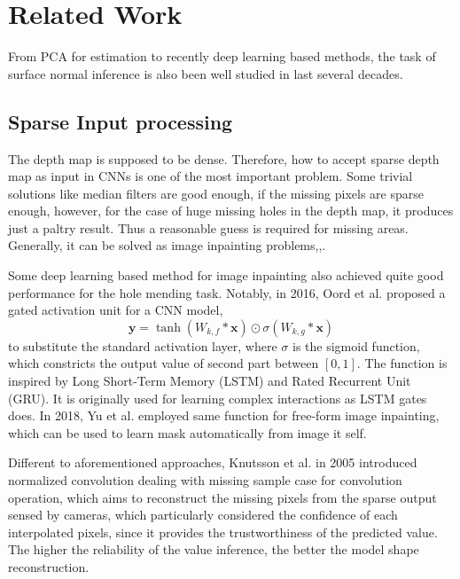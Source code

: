 
\chapter{Related Work} %

\label{ch:02} %


From PCA for estimation to recently deep learning based methods, the task of surface normal inference is also been well studied in last several decades. 


\section{Sparse Input processing}

The depth map is supposed to be dense. Therefore, how to accept sparse depth map as input in CNNs is one of the most important problem. Some trivial solutions like median filters are good enough, if the missing pixels are sparse enough, however, for the case of huge missing holes in the depth map, it produces just a paltry result. Thus a reasonable guess is required for missing areas. Generally, it can be solved as image inpainting problems,\cite{inpainting1},\cite{inpainting2}. 

Some deep learning based method for image inpainting also achieved quite good performance for the hole mending task. 
Notably, in 2016, Oord et al. \cite{gated_activation} proposed a gated activation unit for a CNN model,
\[\textbf{y} = \tanh (W_{k,f} * \textbf{x}) \odot \sigma (W_{k,g} * \textbf{x})\]
to substitute the standard activation layer, where $ \sigma $ is the sigmoid function, which constricts the output value of second part between $ [0,1] $.  The function is inspired by Long Short-Term Memory (LSTM) \cite{lstm} and Rated Recurrent Unit (GRU).\cite{gru} It is originally used for learning complex interactions as LSTM gates does. In 2018, Yu et al. \cite{gconv} employed same function for free-form image inpainting, which can be used to learn mask automatically from image it self.

Different to aforementioned approaches, Knutsson et al. in 2005 introduced normalized convolution \cite{nconv} dealing with missing sample case for convolution operation, which aims to reconstruct the missing pixels from the sparse output sensed by cameras, which particularly considered the confidence of each interpolated pixels, since it provides the trustworthiness of the predicted value. The higher the reliability of the value inference, the better the model shape reconstruction.

